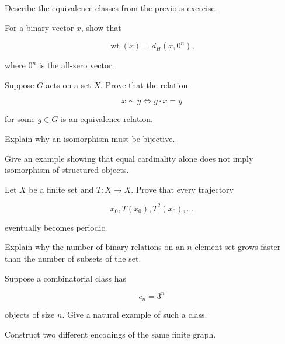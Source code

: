\begin{exercise}[3]
Describe the equivalence classes from the previous exercise.
\end{exercise}

\begin{exercise}[3]
For a binary vector \(x\), show that

\[
\operatorname{wt}(x)
=
d_H(x,0^n),
\]

where \(0^n\) is the all-zero vector.
\end{exercise}

\begin{exercise}[3]
Suppose \(G\) acts on a set \(X\). Prove that the relation

\[
x\sim y
\iff
g\cdot x=y
\]

for some \(g\in G\) is an equivalence relation.
\end{exercise}

\begin{exercise}[3]
Explain why an isomorphism must be bijective.
\end{exercise}

\begin{exercise}[3]
Give an example showing that equal cardinality alone does not imply
isomorphism of structured objects.
\end{exercise}

\begin{exercise}[3]
Let \(X\) be a finite set and \(T:X\to X\). Prove that every trajectory

\[
x_0,
T(x_0),
T^2(x_0),
\ldots
\]

eventually becomes periodic.
\end{exercise}

\begin{exercise}[3]
Explain why the number of binary relations on an \(n\)-element set
grows faster than the number of subsets of the set.
\end{exercise}

\begin{exercise}[3]
Suppose a combinatorial class has

\[
c_n=3^n
\]

objects of size \(n\). Give a natural example of such a class.
\end{exercise}

\begin{exercise}[3]
Construct two different encodings of the same finite graph.
\end{exercise}

